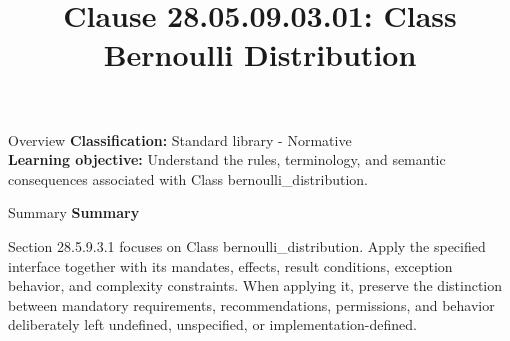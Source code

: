 \documentclass[10pt,letterpaper]{article}
\title{Clause 28.05.09.03.01: Class Bernoulli Distribution}
\author{}
\date{}
\begin{document}
\maketitle
\begin{CornellOverviewBox}{Overview}
\textbf{Classification:} Standard library - Normative\\[2pt]
\textbf{Learning objective:} Understand the rules, terminology, and semantic consequences associated with Class bernoulli\_distribution.
\end{CornellOverviewBox}\begin{CornellSummaryBox}{Summary}
{\sffamily\bfseries\color{Accent} Summary}\par\vspace{3pt}Section 28.5.9.3.1 focuses on Class bernoulli\_distribution. Apply the specified interface together with its mandates, effects, result conditions, exception behavior, and complexity constraints. When applying it, preserve the distinction between mandatory requirements, recommendations, permissions, and behavior deliberately left undefined, unspecified, or implementation-defined.
\end{CornellSummaryBox}
\end{document}
